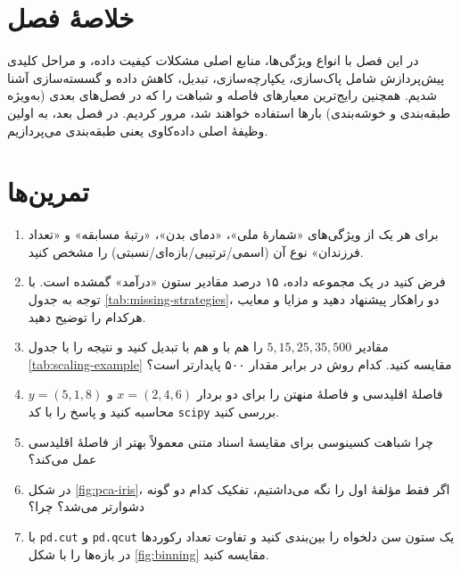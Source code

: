 \section*{خلاصهٔ فصل}

در این فصل با انواع ویژگی‌ها، منابع اصلی مشکلات کیفیت داده، و مراحل کلیدی
پیش‌پردازش شامل پاک‌سازی، یکپارچه‌سازی، تبدیل، کاهش داده و گسسته‌سازی آشنا
شدیم. همچنین رایج‌ترین معیارهای فاصله و شباهت را که در فصل‌های بعدی
(به‌ویژه طبقه‌بندی و خوشه‌بندی) بارها استفاده خواهند شد، مرور کردیم. در
فصل بعد، به اولین وظیفهٔ اصلی داده‌کاوی یعنی طبقه‌بندی می‌پردازیم.

\section*{تمرین‌ها}

\begin{enumerate}
    \item برای هر یک از ویژگی‌های «شمارهٔ ملی»، «دمای بدن»، «رتبهٔ مسابقه»
          و «تعداد فرزندان» نوع آن (اسمی/ترتیبی/بازه‌ای/نسبتی) را مشخص کنید.
    \item فرض کنید در یک مجموعه داده، ۱۵ درصد مقادیر ستون «درآمد» گمشده است.
          با توجه به جدول \ref{tab:missing-strategies}، دو راهکار پیشنهاد دهید و
          مزایا و معایب هرکدام را توضیح دهید.
    \item مقادیر $5, 15, 25, 35, 500$ را هم با  و هم با 
          تبدیل کنید و نتیجه را با جدول \ref{tab:scaling-example} مقایسه کنید. کدام روش
          در برابر مقدار ۵۰۰ پایدارتر است؟
    \item فاصلهٔ اقلیدسی و فاصلهٔ منهتن را برای دو بردار
          $x = (2, 4, 6)$ و $y = (5, 1, 8)$ محاسبه کنید و پاسخ را با کد
          \texttt{scipy} بررسی کنید.
    \item چرا شباهت کسینوسی برای مقایسهٔ اسناد متنی معمولاً بهتر از فاصلهٔ
          اقلیدسی عمل می‌کند؟
    \item در شکل \ref{fig:pca-iris}، اگر فقط مؤلفهٔ اول را نگه می‌داشتیم، تفکیک کدام
          دو گونه دشوارتر می‌شد؟ چرا؟
    \item با \texttt{pd.cut} و \texttt{pd.qcut} یک ستون سن دلخواه را بین‌بندی کنید
          و تفاوت تعداد رکوردها در بازه‌ها را با شکل \ref{fig:binning} مقایسه کنید.
\end{enumerate}
